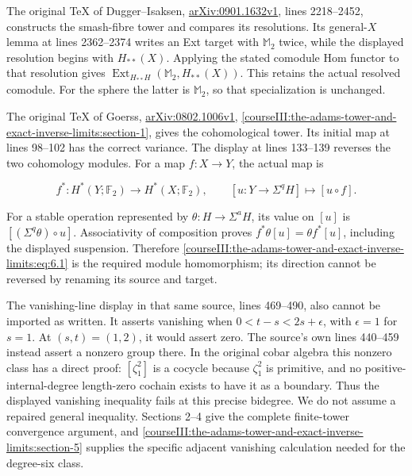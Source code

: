 The original TeX of Dugger--Isaksen, \href{https://arxiv.org/abs/0901.1632v1}{arXiv:0901.1632v1}, lines 2218--2452, constructs the smash-fibre tower and compares its resolutions. Its general-\(X\) lemma at lines 2362--2374 writes an Ext target with \(\mathbb M_2\) twice, while the displayed resolution begins with \(H_{**}(X)\). Applying the stated comodule Hom functor to that resolution gives \(\operatorname{Ext}_{H_{**}H}(\mathbb M_2,H_{**}(X))\). This retains the actual resolved comodule. For the sphere the latter is \(\mathbb M_2\), so that specialization is unchanged.

The original TeX of Goerss, \href{https://arxiv.org/abs/0802.1006v1}{arXiv:0802.1006v1}, \cref{courseIII:the-adams-tower-and-exact-inverse-limits:section-1}, gives the cohomological tower. Its initial map at lines 98--102 has the correct variance. The display at lines 133--139 reverses the two cohomology modules. For a map \(f:X\to Y\), the actual map is

\begin{equation}
f^*:H^*(Y;\mathbb F_2)\longrightarrow H^*(X;\mathbb F_2),
 \qquad [u:Y\to\Sigma^qH]\longmapsto[u\circ f].
 \label{courseIII:the-adams-tower-and-exact-inverse-limits:eq:6.1}
\end{equation}

For a stable operation represented by \(\theta:H\to\Sigma^aH\), its value on \([u]\) is \([(\Sigma^q\theta)\circ u]\). Associativity of composition proves
\(f^*\theta[u]=\theta f^*[u]\), including the displayed suspension. Therefore \eqref{courseIII:the-adams-tower-and-exact-inverse-limits:eq:6.1} is the required module homomorphism; its direction cannot be reversed by renaming its source and target.

The vanishing-line display in that same source, lines 469--490, also cannot be imported as written. It asserts vanishing when \(0<t-s<2s+\epsilon\), with \(\epsilon=1\) for \(s=1\). At \((s,t)=(1,2)\), it would assert zero. The source's own lines 440--459 instead assert a nonzero group there. In the original cobar algebra this nonzero class has a direct proof: \([\zeta_1^2]\) is a cocycle because \(\zeta_1^2\) is primitive, and no positive-internal-degree length-zero cochain exists to have it as a boundary. Thus the displayed vanishing inequality fails at this precise bidegree. We do not assume a repaired general inequality. Sections 2--4 give the complete finite-tower convergence argument, and \cref{courseIII:the-adams-tower-and-exact-inverse-limits:section-5} supplies the specific adjacent vanishing calculation needed for the degree-six class.

